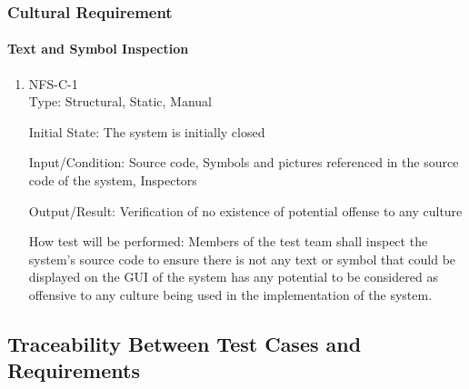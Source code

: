 \documentclass[12pt, titlepage]{article}
\begin{document}
\subsubsection{Cultural Requirement}
\paragraph{Text and Symbol Inspection}
\begin{enumerate}

\item{NFS-C-1\\}
Type: Structural, Static, Manual

Initial State: The system is initially closed

Input/Condition: Source code, Symbols and pictures referenced in the source code of the system, Inspectors

Output/Result: Verification of no existence of potential offense to any culture

How test will be performed: Members of the test team shall inspect the system's source code to ensure there is not any text or symbol that could be displayed on the GUI of the system has any potential to be considered as offensive to any culture being used in the implementation of the system. 
\end{enumerate}

\subsection{Traceability Between Test Cases and Requirements}
\end{document}
